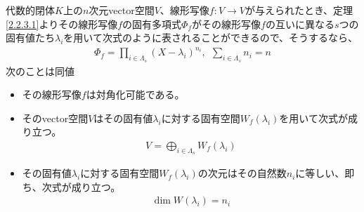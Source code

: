 \documentclass[dvipdfmx]{jsarticle}
\begin{document}
\begin{thm}[対角化条件]
\label{2.2.4.15}
代数的閉体$K$上の$n$次元vector空間$V$、線形写像$f:V \rightarrow V$が与えられたとき、定理\ref{2.2.3.1}よりその線形写像$f$の固有多項式$\varPhi_{f}$がその線形写像$f$の互いに異なる$s$つの固有値たち$\lambda_{i}$を用いて次式のように表されることができるので、そうするなら、
\begin{align*}
\varPhi_{f} = \prod_{i \in \varLambda_{s}} \left( X - \lambda_{i} \right)^{n_{i}},\ \ \sum_{i \in \varLambda_{s}} n_{i} = n
\end{align*}
次のことは同値
\begin{itemize}
\item
  その線形写像$f$は対角化可能である。
\item
  そのvector空間$V$はその固有値$\lambda_{i}$に対する固有空間$W_{f}\left( \lambda_{i} \right)$を用いて次式が成り立つ。
\begin{align*}
V = \bigoplus_{i \in \varLambda_{s}} {W_{f}\left( \lambda_{i} \right)}
\end{align*}
\item
  その固有値$\lambda_{i}$に対する固有空間$W_{f}\left( \lambda_{i} \right)$の次元はその自然数$n_{i}$に等しい、即ち、次式が成り立つ。
\begin{align*}
\dim{W\left( \lambda_{i} \right)} = n_{i}
\end{align*}
\end{itemize}
\end{thm}
\end{document}
